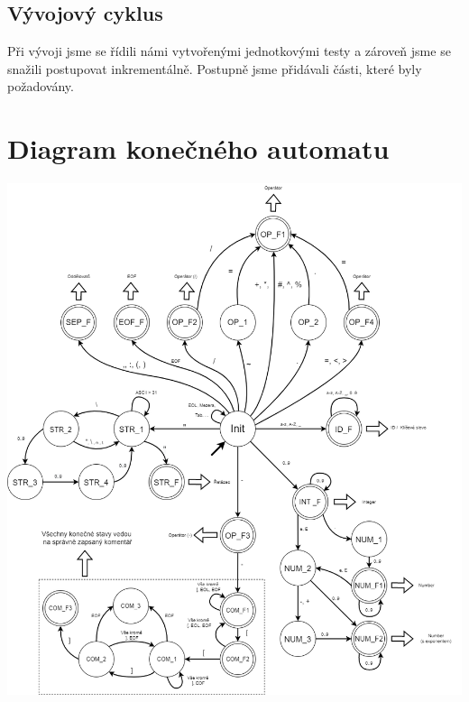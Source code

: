 \documentclass[11pt]{article}
\begin{document}
    \subsection{Vývojový cyklus}
        Při vývoji jsme se řídili námi vytvořenými jednotkovými testy a zároveň jsme se snažili postupovat inkrementálně. Postupně jsme přidávali části, které byly požadovány.

        \pagebreak
	
    
    
    \section{Diagram konečného automatu}
        \vspace{9mm}
        \includegraphics[width=1\linewidth]{FSM.png}
        \pagebreak
    
\end{document}
